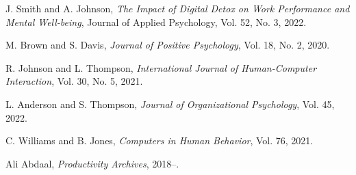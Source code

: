 {}
\begin{thebibliography}{99} %


J. Smith and A. Johnson,
\textit{The Impact of Digital Detox on Work Performance and Mental Well-being},
Journal of Applied Psychology, Vol. 52, No. 3, 2022.

M. Brown and S. Davis,
\textit{Journal of Positive Psychology},
Vol. 18, No. 2, 2020.

R. Johnson and L. Thompson,
\textit{International Journal of Human-Computer Interaction},
Vol. 30, No. 5, 2021.

L. Anderson and S. Thompson,
\textit{Journal of Organizational Psychology},
Vol. 45, 2022.

C. Williams and B. Jones,
\textit{Computers in Human Behavior},
Vol. 76, 2021.

Ali Abdaal,
\textit{Productivity Archives},
2018--.
\end{thebibliography}

